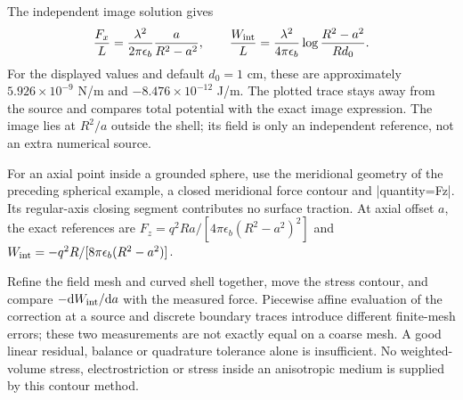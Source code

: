 The independent image solution gives
\[
 \frac{F_x}{L}=\frac{\lambda^2}{2\pi\epsilon_b}
               \frac{a}{R^2-a^2},\qquad
 \frac{W_{\rm int}}{L}=\frac{\lambda^2}{4\pi\epsilon_b}
               \log\frac{R^2-a^2}{R d_0}.
\]
For the displayed values and default $d_0=1$ cm, these are approximately
$5.926\times10^{-9}$ N/m and $-8.476\times10^{-12}$ J/m.
The plotted trace stays away from the source and compares total potential
with the exact image expression. The image lies at $R^2/a$ outside the shell;
its field is only an independent reference, not an extra numerical source.

\Needspace{14cm}
\begin{codeexample}[width=0pt]
\end{codeexample}

For an axial point inside a grounded sphere, use the meridional geometry of
the preceding spherical example, a closed meridional force contour and
|quantity=Fz|. Its regular-axis closing segment contributes no surface traction.
At axial offset $a$, the exact references are
$F_z=q^2Ra/[4\pi\epsilon_b(R^2-a^2)^2]$ and
$W_{\rm int}=-q^2R/[8\pi\epsilon_b(R^2-a^2)]$.

Refine the field mesh and curved shell together, move the stress contour, and
compare $-\mathrm dW_{\rm int}/\mathrm da$ with the measured force. Piecewise
affine evaluation of the correction at a source and discrete boundary traces
introduce different finite-mesh errors; these two measurements are not exactly
equal on a coarse mesh. A good linear residual, balance or quadrature tolerance
alone is insufficient. No weighted-volume stress, electrostriction or stress
inside an anisotropic medium is supplied by this contour method.
